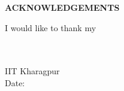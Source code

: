 \thispagestyle{plain}

\begin{center}
 \Large {\bf \uppercase{Acknowledgements}}
\end{center}

\vspace{3\baselineskip}

\noindent
I would like to thank my 

\noindent
\vspace{\baselineskip} \\
\textbf{\myname} \\
IIT Kharagpur \\
Date: